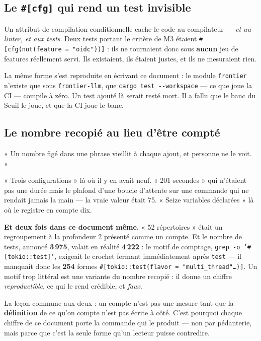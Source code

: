 \documentclass[10pt]{report}
\newcommand{\code}[1]{\texttt{\small #1}}
\newcommand{\att}[1]{\textcolor{amber}{\textbf{#1}}}
\begin{document}
\subsection{Le \code{\#{}[cfg]} qui rend un test invisible}

Un attribut de compilation conditionnelle cache le code au compilateur --- \emph{et au linter, et aux
tests}. Deux tests portant le critère de M3 étaient \code{\#{}[cfg(not(feature = "oidc"))]} : ils ne
tournaient donc sous \textbf{aucun} jeu de features réellement servi. Ils existaient, ils étaient
justes, et ils ne mesuraient rien.

La même forme s'est reproduite en écrivant ce document : le module \code{frontier} n'existe que sous
\code{frontier-llm}, que \code{cargo test -{}-workspace} --- ce que joue la CI --- compile à zéro. Un
test ajouté là serait resté mort. Il a fallu que le banc du Seuil le joue, et que la CI joue le banc.

\subsection{Le nombre recopié au lieu d'être compté}

\begin{these}
« Un nombre figé dans une phrase vieillit à chaque ajout, et personne ne le voit. »
\end{these}

« Trois configurations » là où il y en avait neuf. « 201 secondes » qui n'étaient pas une durée mais
le plafond d'une boucle d'attente sur une commande qui ne rendait jamais la main --- la vraie valeur
était 75. « Seize variables déclarées » là où le registre en compte dix.

\att{Et deux fois dans ce document même.} « 52 répertoires » était un regroupement à la profondeur 2
présenté comme un compte. Et le nombre de tests, annoncé \textbf{3\,975}, valait en réalité
\textbf{4\,222} : le motif de comptage, \code{grep -o '\#[tokio::test]'}, exigeait le crochet
fermant immédiatement après \code{test} --- il manquait donc les \textbf{254} formes
\code{\#[tokio::test(flavor = "multi\_thread"\ldots)]}. Un motif trop littéral est une variante du
nombre recopié : il donne un chiffre \emph{reproductible}, ce qui le rend crédible, et \emph{faux}.

\begin{these}
La leçon commune aux deux : un compte n'est pas une mesure tant que la \textbf{définition} de ce
qu'on compte n'est pas écrite à côté. C'est pourquoi chaque chiffre de ce document porte la commande
qui le produit --- non par pédanterie, mais parce que c'est la seule forme qu'un lecteur puisse
contredire.
\end{these}
\end{document}
